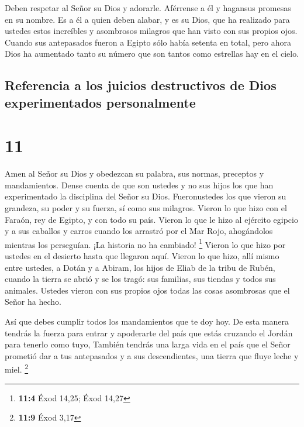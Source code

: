  Deben respetar al Señor su Dios y adorarle. Aférrense a
él y hagansus promesas en su nombre.  Es a él a quien
deben alabar, y es su Dios, que ha realizado para ustedes estos
increíbles y asombrosos milagros que han visto con sus propios ojos.
 Cuando sus antepasados fueron a Egipto sólo había
setenta en total, pero ahora Dios ha aumentado tanto su número que son
tantos como estrellas hay en el cielo.

\hypertarget{referencia-a-los-juicios-destructivos-de-dios-experimentados-personalmente}{%
\subsection{Referencia a los juicios destructivos de Dios experimentados
personalmente}\label{referencia-a-los-juicios-destructivos-de-dios-experimentados-personalmente}}

\hypertarget{section-10}{%
\section{11}\label{section-10}}

 Amen al Señor su Dios y obedezcan su palabra, sus normas,
preceptos y mandamientos.  Dense cuenta de que son ustedes
y no sus hijos los que han experimentado la disciplina del Señor su
Dios. Fueronustedes los que vieron su grandeza, su poder y su fuerza,
 sí como sus milagros. Vieron lo que hizo con el Faraón,
rey de Egipto, y con todo su país.  Vieron lo que le hizo
al ejército egipcio y a sus caballos y carros cuando los arrastró por el
Mar Rojo, ahogándolos mientras los perseguían. ¡La historia no ha
cambiado! \footnote{\textbf{11:4} Éxod 14,25; Éxod 14,27} 
Vieron lo que hizo por ustedes en el desierto hasta que llegaron aquí.
 Vieron lo que hizo, allí mismo entre ustedes, a Dotán y a
Abiram, los hijos de Eliab de la tribu de Rubén, cuando la tierra se
abrió y se los tragó: sus familias, sus tiendas y todos sus animales.
 Ustedes vieron con sus propios ojos todas las cosas
asombrosas que el Señor ha hecho.

 Así que debes cumplir todos los mandamientos que te doy
hoy. De esta manera tendrás la fuerza para entrar y apoderarte del país
que estás cruzando el Jordán para tenerlo como tuyo, 
También tendrás una larga vida en el país que el Señor prometió dar a
tus antepasados y a sus descendientes, una tierra que fluye leche y
miel. \footnote{\textbf{11:9} Éxod 3,17}

